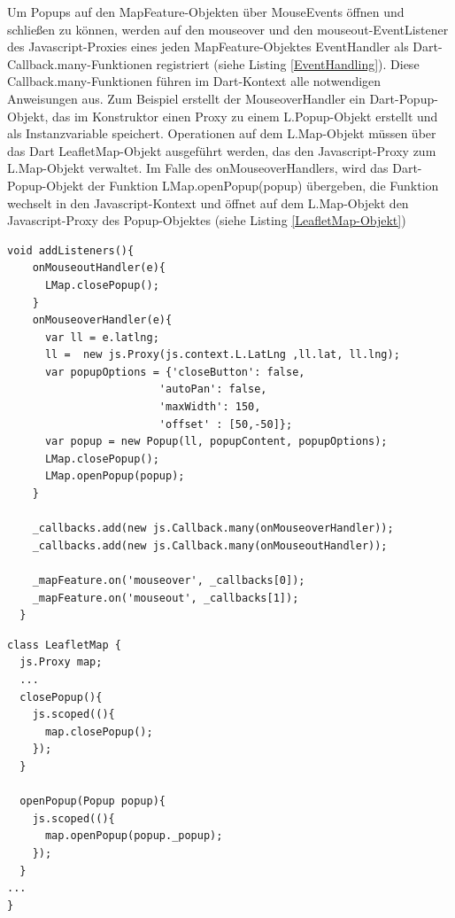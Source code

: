 Um Popups auf den MapFeature-Objekten über MouseEvents öffnen und schließen zu können, werden auf den mouseover und den mouseout-EventListener des Javascript-Proxies eines jeden MapFeature-Objektes EventHandler als Dart-Callback.many-Funktionen registriert (siehe Listing \ref{EventHandling}). Diese Callback.many-Funktionen führen im Dart-Kontext alle notwendigen Anweisungen aus. Zum Beispiel erstellt der MouseoverHandler ein Dart-Popup-Objekt, das im Konstruktor einen Proxy zu einem L.Popup-Objekt erstellt und als Instanzvariable speichert. Operationen auf dem L.Map-Objekt müssen über das Dart LeafletMap-Objekt ausgeführt werden, das den Javascript-Proxy zum L.Map-Objekt verwaltet. Im Falle des onMouseoverHandlers, wird das Dart-Popup-Objekt der Funktion LMap.openPopup(popup) übergeben, die Funktion wechselt in den Javascript-Kontext und öffnet auf dem L.Map-Objekt den Javascript-Proxy des Popup-Objektes (siehe Listing \ref{LeafletMap-Objekt})
\\
\begin{lstlisting}[caption=EventHandling mithilfe von Callback-Funktionen, label= EventHandling]
void addListeners(){
    onMouseoutHandler(e){
      LMap.closePopup();
    }
    onMouseoverHandler(e){
      var ll = e.latlng;
      ll =  new js.Proxy(js.context.L.LatLng ,ll.lat, ll.lng);
      var popupOptions = {'closeButton': false,
                        'autoPan': false,
                        'maxWidth': 150, 
                        'offset' : [50,-50]};
      var popup = new Popup(ll, popupContent, popupOptions);
      LMap.closePopup();
      LMap.openPopup(popup);
    }
    
    _callbacks.add(new js.Callback.many(onMouseoverHandler));
    _callbacks.add(new js.Callback.many(onMouseoutHandler));
    
    _mapFeature.on('mouseover', _callbacks[0]);
    _mapFeature.on('mouseout', _callbacks[1]);
  }
  \end{lstlisting}
  \begin{lstlisting}[caption=Zugriff auf das L.Map-Objekt (im Javascript-Kontext) über das LeafletMap-Objekt (im Dart-Kontext) in LeafletMap.dart, label= LeafletMap-Objekt]
class LeafletMap {
  js.Proxy map;
  ...
  closePopup(){
    js.scoped((){
      map.closePopup();
    });
  }

  openPopup(Popup popup){
    js.scoped((){
      map.openPopup(popup._popup);
    });
  }
...
}  
  \end{lstlisting}